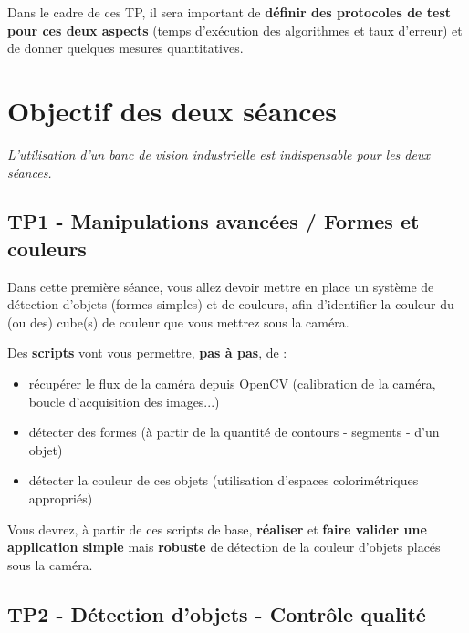 \documentclass[a4paper,12pt,titlepage]{article} %
\begin{document}
\medskip

Dans le cadre de ces TP, il sera important de \textbf{définir des protocoles de test pour ces deux aspects} (temps d'exécution des algorithmes et taux d'erreur) et de donner quelques mesures quantitatives.

\newpage


\section{Objectif des deux séances}

\textit{L'utilisation d'un banc de vision industrielle est indispensable pour les deux séances.}

\subsection{TP1 - Manipulations avancées / Formes et couleurs}

Dans cette première séance, vous allez devoir mettre en place un système de détection d'objets (formes simples) et de couleurs, afin d'identifier la couleur du (ou des) cube(s) de couleur que vous mettrez sous la caméra.

\medskip

Des \textbf{scripts} vont vous permettre, \textbf{pas à pas}, de :

\begin{itemize}
	\item récupérer le flux de la caméra depuis OpenCV (calibration de la caméra, boucle d'acquisition des images...)
	\item détecter des formes (à partir de la quantité de contours - segments - d'un objet)
	\item détecter la couleur de ces objets (utilisation d'espaces colorimétriques appropriés)
\end{itemize}

\medskip

Vous devrez, à partir de ces scripts de base, \textbf{réaliser} et \textbf{faire valider une application simple} mais \textbf{robuste} de détection de la couleur d'objets placés sous la caméra.

\subsection{TP2 - Détection d'objets - Contrôle qualité}
\end{document}
